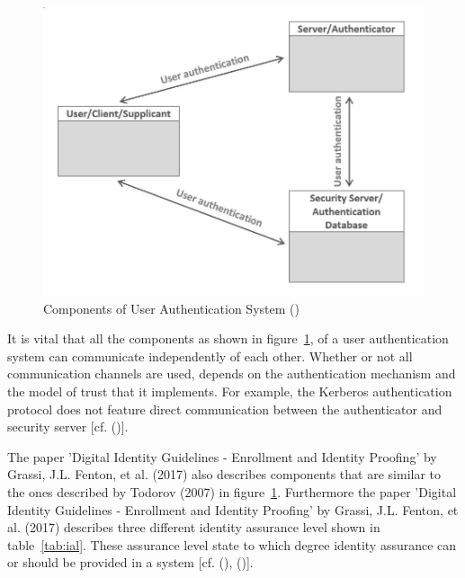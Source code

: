 \begin{figure}[h]
	\centering
	\includegraphics[width=0.8\linewidth]{images/identity_proofing_architectur}
	\caption[Componets Authentication]{Components of User Authentication System (\cite{Todorov:2007:MUI})}
	\label{fig:componentsuserauthenticationsystem}
\end{figure}

It is vital that all the components as shown in figure~\ref{fig:componentsuserauthenticationsystem}, of a user authentication system can communicate independently of each other. Whether or not all communication channels are used, depends on the authentication mechanism and the model of trust that it implements. For example, the Kerberos authentication protocol does not feature direct communication between the authenticator and security server [cf. (\cite{Todorov:2007:MUI})]. 

The paper 'Digital Identity Guidelines - Enrollment and Identity Proofing' by Grassi, J.L. Fenton, et al. (2017) also describes components that are similar to the ones described by Todorov (2007) in figure~\ref{fig:componentsuserauthenticationsystem}. Furthermore the paper 'Digital Identity Guidelines - Enrollment and Identity Proofing' by Grassi, J.L. Fenton, et al. (2017) describes three different identity assurance level shown in table~\ref{tab:ial}. These assurance level state to which degree identity assurance can or should be provided in a system [cf. (\cite{NIST:2017:DIGEIP}), (\cite{Todorov:2007:MUI})]. 



